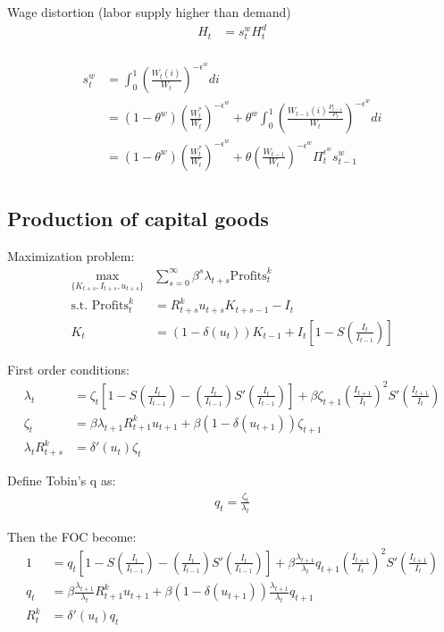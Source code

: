 \documentclass[11pt]{article}
\begin{document}
Wage distortion (labor supply higher than demand)
\begin{align*}
	H_t &= s_t^w H_t^d \\
\end{align*}

\begin{align*}
	s_t^w &= \int_0^1 \left(\frac{W_{t}(i)}{W_t}\right)^{-\epsilon^w}di \\
	&= (1-\theta^w)\left(\frac{W_t^*}{W_t}\right)^{-\epsilon^w} + \theta^w \int_0^1   \left(\frac{W_{t-1}(i)\frac{P_{t-1}}{P_t}}{W_t}\right)^{-\epsilon^w}di \\
	&=(1-\theta^w)\left(\frac{W_t^*}{W_t}\right)^{-\epsilon^w} + \theta \left(\frac{W_{t-1}}{W_t}\right)^{-\epsilon^w}\Pi_t^{\epsilon^w} s_{t-1}^w \\
\end{align*}


\subsection{Production of capital goods}

Maximization problem:
\begin{align*}
	\max_{\{K_{t+s},I_{t+s}, u_{t+s}\}} &\sum_{s=0}^{\infty}\beta^s \lambda_{t+s} \text{Profits}_t^k\\
	\text{s.t. } \text{Profits}_t^k &= R_{t+s}^k u_{t+s} K_{t+s-1} - I_t\\
	K_t &=  (1-\delta(u_t))K_{t-1} + I_t \left[1-S\left(\frac{I_t}{I_{t-1}}\right)\right]
\end{align*}

First order conditions:
\begin{align*}
	\lambda_{t} &= \zeta_t \left[1-S\left(\frac{I_t}{I_{t-1}}\right) - \left(\frac{I_t}{I_{t-1}}\right) S'\left(\frac{I_t}{I_{t-1}}\right)\right] + \beta \zeta_{t+1} \left(\frac{I_{t+1}}{I_{t}}\right)^2 S'\left(\frac{I_{t+1}}{I_{t}}\right) \\
	\zeta_t &= \beta \lambda_{t+1} R_{t+1}^k u_{t+1} + \beta(1-\delta(u_{t+1}))\zeta_{t+1} \\
	\lambda_t R_{t+s}^k &=\delta'(u_{t})\zeta_t 
\end{align*}

Define Tobin's q as:
\begin{align*}
	q_t=\frac{\zeta_t}{\lambda_t}
\end{align*}

Then the FOC become:
\begin{align*}
	1 &= q_t \left[1-S\left(\frac{I_t}{I_{t-1}}\right) -  \left(\frac{I_t}{I_{t-1}}\right) S'\left(\frac{I_t}{I_{t-1}}\right)\right] + \beta \frac{\lambda_{t+1}}{\lambda_t} q_{t+1} \left(\frac{I_{t+1}}{I_{t}}\right)^2 S'\left(\frac{I_{t+1}}{I_{t}}\right) \\
	q_t &= \beta \frac{\lambda_{t+1}}{\lambda_t} R_{t+1}^k u_{t+1} + \beta(1-\delta(u_{t+1})) \frac{\lambda_{t+1}}{\lambda_t} q_{t+1} \\
	 R_{t}^k &=\delta'(u_{t})q_t
\end{align*}
\end{document}
